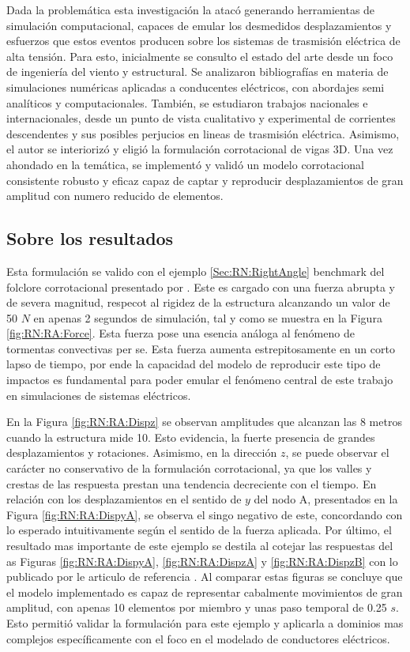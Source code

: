 Dada la problemática esta investigación la atacó  generando herramientas de simulación computacional, capaces de emular los desmedidos desplazamientos y esfuerzos que estos eventos producen sobre los sistemas de trasmisión eléctrica de alta tensión. Para esto, inicialmente se consulto el estado del arte desde un foco de ingeniería del viento y estructural. Se analizaron bibliografías en materia de simulaciones numéricas aplicadas a conducentes eléctricos, con abordajes semi analíticos y computacionales. También, se estudiaron trabajos nacionales e internacionales, desde un punto de vista cualitativo y experimental de corrientes descendentes y sus posibles perjucios  en lineas de trasmisión eléctrica.  Asimismo, el autor se interiorizó y eligió la formulación corrotacional de vigas 3D. Una vez ahondado en la temática, se implementó y validó un modelo corrotacional consistente robusto y eficaz capaz de captar y reproducir desplazamientos de gran amplitud con numero reducido de elementos.


\subsection{Sobre los resultados}

Esta formulación se valido con el ejemplo \ref{Sec:RN:RightAngle} benchmark del folclore corrotacional presentado por \cite{simo1988dynamics}. Este es cargado con una fuerza abrupta y de severa magnitud, respecot al  rigidez de la estructura alcanzando un valor de 50 $N$ en apenas 2 segundos de simulación, tal y como se muestra en la Figura \ref{fig:RN:RA:Force}. Esta fuerza pose una esencia análoga al fenómeno de tormentas convectivas per se. Esta fuerza aumenta estrepitosamente en un corto lapso de tiempo, por ende la capacidad del modelo de reproducir este tipo de impactos es fundamental para poder emular el fenómeno central de este trabajo en simulaciones de sistemas eléctricos.

 En la Figura \ref{fig:RN:RA:Dispz} se observan amplitudes que alcanzan las 8 metros cuando la estructura mide 10. Esto evidencia, la fuerte presencia de grandes desplazamientos y rotaciones. Asimismo, en la dirección $z$, se puede observar el carácter no conservativo de la formulación corrotacional, ya que los valles y crestas de las respuesta prestan una tendencia decreciente con el tiempo. En relación con los desplazamientos en el sentido de $y$ del nodo A, presentados en la Figura \ref{fig:RN:RA:DispyA}, se observa el singo negativo de este, concordando con lo esperado intuitivamente según el sentido de la fuerza aplicada. Por último, el resultado mas importante de este ejemplo se destila al cotejar las respuestas del as Figuras \ref{fig:RN:RA:DispyA}, \ref{fig:RN:RA:DispzA} y \ref{fig:RN:RA:DispzB} con lo publicado por le articulo de referencia \citep{Le2014}. Al comparar estas figuras se concluye que el modelo implementado es capaz de representar cabalmente movimientos de gran amplitud, con apenas 10 elementos por miembro y unas paso temporal de 0.25 $s$. Esto permitió validar la formulación para este ejemplo y aplicarla a dominios mas complejos específicamente con el foco en el modelado de conductores eléctricos. 

